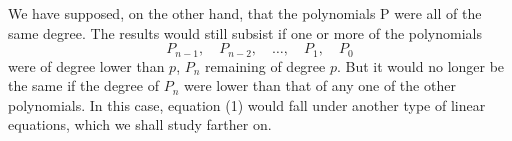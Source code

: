 \documentclass[11pt]{article}
\begin{document}
We have supposed, on the other hand, that the polynomials P were all of the same degree. The results would still subsist if one or more of the polynomials
\[
P_{n-1},\quad P_{n-2},\quad \ldots,\quad P_1,\quad P_0
\]
were of degree lower than $p$, $P_n$ remaining of degree $p$. But it would no longer be the same if the degree of $P_n$ were lower than that of any one of the other polynomials. In this case, equation (1) would fall under another type of linear equations, which we shall study farther on.
\end{document}
